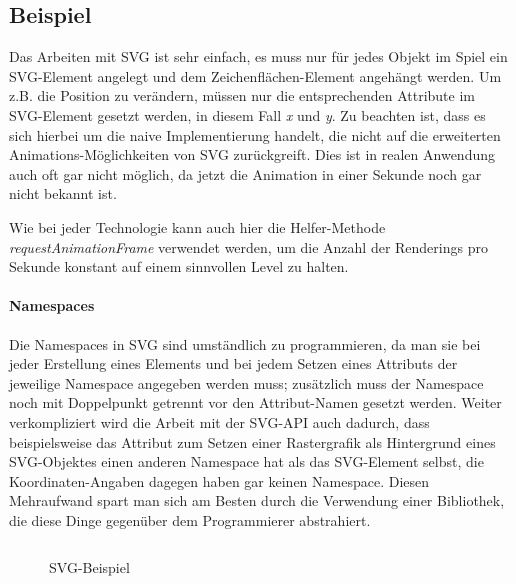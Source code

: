 \documentclass[a4paper, 12pt]{article}
\begin{document}
\subsection{Beispiel}
Das Arbeiten mit SVG ist sehr einfach, es muss nur für jedes Objekt im Spiel ein SVG-Element angelegt und dem Zeichenflächen-Element angehängt werden. Um z.B. die Position zu verändern, müssen nur die entsprechenden Attribute im SVG-Element gesetzt werden, in diesem Fall \emph{x} und \emph{y}. Zu beachten ist, dass es sich hierbei um die naive Implementierung handelt, die nicht auf die erweiterten Animations-Möglichkeiten von SVG zurückgreift. Dies ist in realen Anwendung auch oft gar nicht möglich, da jetzt die Animation in einer Sekunde noch gar nicht bekannt ist.

Wie bei jeder Technologie kann auch hier die Helfer-Methode \emph{requestAnimationFrame} verwendet werden, um die Anzahl der Renderings pro Sekunde konstant auf einem sinnvollen Level zu halten.

\paragraph{Namespaces} Die Namespaces in SVG sind umständlich zu programmieren, da man sie bei jeder Erstellung eines Elements und bei jedem Setzen eines Attributs der jeweilige Namespace angegeben werden muss; zusätzlich muss der Namespace noch mit Doppelpunkt getrennt vor den Attribut-Namen gesetzt werden. Weiter verkompliziert wird die Arbeit mit der SVG-API auch dadurch, dass beispielsweise das Attribut zum Setzen einer Rastergrafik als Hintergrund eines SVG-Objektes einen anderen Namespace hat als das SVG-Element selbst, die Koordinaten-Angaben dagegen haben gar keinen Namespace. Diesen Mehraufwand spart man sich am Besten durch die Verwendung einer Bibliothek, die diese Dinge gegenüber dem Programmierer abstrahiert.\cite{SVGNamespaces}
\begin{figure}[H]
	\inputminted{javascript}{assets/vanillasvg_example.js}
	\caption{SVG-Beispiel}
	\label{svg_example}
\end{figure}
\newpage
\end{document}
